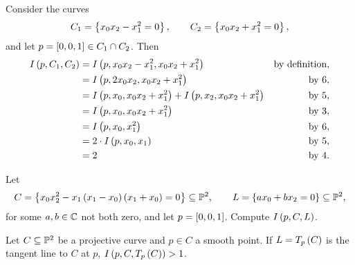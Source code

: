 \pagebreak

\begin{example}
Consider the curves
$$ C_1 = \cb{x_0x_2 - x_1^2 = 0}, \qquad C_2 = \cb{x_0x_2 + x_1^2 = 0}, $$
and let $ p = \sb{0, 0, 1} \in C_1 \cap C_2 $. Then
\begin{align*}
I\rb{p, C_1, C_2}
& = I\rb{p, x_0x_2 - x_1^2, x_0x_2 + x_1^2} & \text{by definition}, \\
& = I\rb{p, 2x_0x_2, x_0x_2 + x_1^2} & \text{by} \ 6, \\
& = I\rb{p, x_0, x_0x_2 + x_1^2} + I\rb{p, x_2, x_0x_2 + x_1^2} & \text{by} \ 5, \\
& = I\rb{p, x_0, x_0x_2 + x_1^2} & \text{by} \ 3, \\
& = I\rb{p, x_0, x_1^2} & \text{by} \ 6, \\
& = 2 \cdot I\rb{p, x_0, x_1} & \text{by} \ 5, \\
& = 2 & \text{by} \ 4.
\end{align*}
\end{example}


\begin{exercise}
Let
$$ C = \cb{x_0x_2^2 - x_1\rb{x_1 - x_0}\rb{x_1 + x_0} = 0} \subseteq \P^2, \qquad L = \cb{ax_0 + bx_2 = 0} \subseteq \P^2, $$
for some $ a, b \in \C $ not both zero, and let $ p = \sb{0, 0, 1} $. Compute $ I\rb{p, C, L} $.
\end{exercise}

\begin{proposition}
Let $ C \subseteq \P^2 $ be a projective curve and $ p \in C $ a smooth point. If $ L = T_p\rb{C} $ is the tangent line to $ C $ at $ p $, $ I\rb{p, C, T_p\rb{C}} > 1 $.
\end{proposition}

